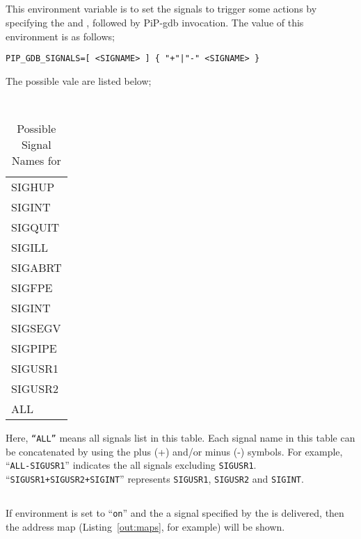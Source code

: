 \subsection{}

This environment variable  is to set the
signals to trigger some actions by specifying the
 and , followed by
PiP-gdb invocation. The value of this environment is as follows;

\begin{lstlisting}[frame=tb]
  PIP_GDB_SIGNALS=[ <SIGNAME> ] { "+"|"-" <SIGNAME> }
\end{lstlisting}

The possible {\tt{}} vale are listed below;

\begin{table}[ht]
  \centering
  \caption{Possible Signal Names for }
  \vspace{3mm}
  \tt
  \begin{tabular}{l}
    SIGHUP \\
    SIGINT \\
    SIGQUIT \\
    SIGILL \\
    SIGABRT \\
    SIGFPE \\
    SIGINT \\
    SIGSEGV \\
    SIGPIPE \\
    SIGUSR1 \\
    SIGUSR2 \\
    ALL \\
  \end{tabular}
\end{table}

Here, {\tt ``ALL''} means all signals list in this table. Each signal
name in this table can be concatenated by using the plus (+) and/or
minus (-) symbols.  For example, ``{\tt ALL-SIGUSR1}'' indicates the
all signals excluding {\tt SIGUSR1}. ``{\tt SIGUSR1+SIGUSR2+SIGINT}''
represents {\tt SIGUSR1}, {\tt SIGUSR2} and {\tt SIGINT}. 

\subsection{}

If  environment is set to ``{\tt on}'' and the
a signal specified by the  is delivered, then
the address map (Listing~\ref{out:maps}, for example) will be shown. 

